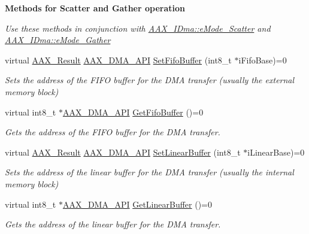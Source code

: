 \begin{Indent}{\bf Methods for Scatter and Gather operation}\par
{\em Use these methods in conjunction with \hyperlink{a00095_af8d0f19f2896dd6dbd126b919b24e39bac8f3cbed92bc7d135e306cc154ac2ae6}{A\+A\+X\+\_\+\+I\+Dma\+::e\+Mode\+\_\+\+Scatter} and \hyperlink{a00095_af8d0f19f2896dd6dbd126b919b24e39badec2b76540ba9a168b7a049acb50654d}{A\+A\+X\+\_\+\+I\+Dma\+::e\+Mode\+\_\+\+Gather} }\begin{DoxyCompactItemize}
\item 
virtual \hyperlink{a00149_a4d8f69a697df7f70c3a8e9b8ee130d2f}{A\+A\+X\+\_\+\+Result} \hyperlink{a00243_acae60d01e5e4bd3282369d0d9d378f3f}{A\+A\+X\+\_\+\+D\+M\+A\+\_\+\+A\+P\+I} \hyperlink{a00095_afeda3af6b2c5da7a8b2759aa9429c7dc}{Set\+Fifo\+Buffer} (int8\+\_\+t $\ast$i\+Fifo\+Base)=0
\begin{DoxyCompactList}\small\item\em Sets the address of the F\+I\+F\+O buffer for the D\+M\+A transfer (usually the external memory block) \end{DoxyCompactList}\item 
virtual int8\+\_\+t $\ast$\hyperlink{a00243_acae60d01e5e4bd3282369d0d9d378f3f}{A\+A\+X\+\_\+\+D\+M\+A\+\_\+\+A\+P\+I} \hyperlink{a00095_af5c4988d5f844b219077773e4e810d64}{Get\+Fifo\+Buffer} ()=0
\begin{DoxyCompactList}\small\item\em Gets the address of the F\+I\+F\+O buffer for the D\+M\+A transfer. \end{DoxyCompactList}\item 
virtual \hyperlink{a00149_a4d8f69a697df7f70c3a8e9b8ee130d2f}{A\+A\+X\+\_\+\+Result} \hyperlink{a00243_acae60d01e5e4bd3282369d0d9d378f3f}{A\+A\+X\+\_\+\+D\+M\+A\+\_\+\+A\+P\+I} \hyperlink{a00095_ad0c409f61f989e72f6afd47cb02b108e}{Set\+Linear\+Buffer} (int8\+\_\+t $\ast$i\+Linear\+Base)=0
\begin{DoxyCompactList}\small\item\em Sets the address of the linear buffer for the D\+M\+A transfer (usually the internal memory block) \end{DoxyCompactList}\item 
virtual int8\+\_\+t $\ast$\hyperlink{a00243_acae60d01e5e4bd3282369d0d9d378f3f}{A\+A\+X\+\_\+\+D\+M\+A\+\_\+\+A\+P\+I} \hyperlink{a00095_a5a23f32e268d310ea6c80049c1661982}{Get\+Linear\+Buffer} ()=0
\begin{DoxyCompactList}\small\item\em Gets the address of the linear buffer for the D\+M\+A transfer. \end{DoxyCompactList}\item 

\end{DoxyCompactItemize}
\end{Indent}
